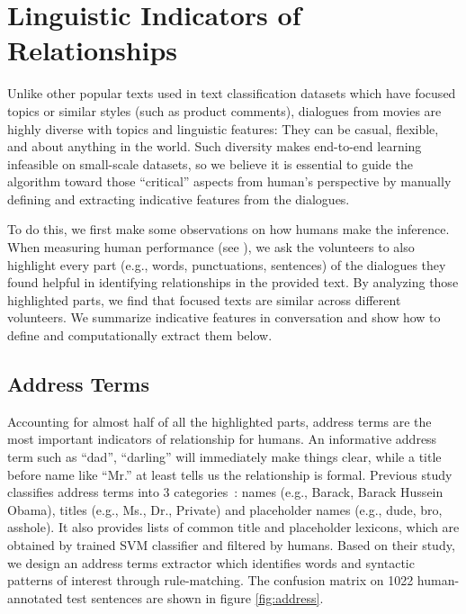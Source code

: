 %
\section{Linguistic Indicators of Relationships}
\label{sec:method}
 
Unlike other popular texts used in text classification datasets which 
have focused topics or similar styles (such as product comments), 
dialogues from movies are highly diverse with topics and linguistic
features: They can be casual, flexible, and about anything in the world.
Such diversity makes end-to-end learning 
infeasible on small-scale datasets, so we believe 
it is essential to guide the algorithm toward those ``critical'' 
aspects from human's perspective by manually defining and extracting 
indicative features from the dialogues.

To do this, we first make some observations on how humans make the inference. 
When measuring human performance (see ), 
we ask the volunteers to also highlight every part 
(e.g., words, punctuations, sentences) of the dialogues they found 
helpful in identifying relationships in the provided text. 
By analyzing those highlighted parts, 
we find that focused texts are similar across different volunteers. 
We summarize indicative features in conversation and show how to define and 
computationally extract them below.  

\subsection*{Address Terms} 
\label{sec:address terms}
Accounting for almost half of all the highlighted parts, address terms are
the most important indicators of relationship for humans. 
An informative address term such as ``dad'', ``darling'' will 
immediately make things clear, while a title before name like 
``Mr.'' at least tells us the relationship is formal. 
Previous study classifies address terms into 
3 categories~\cite{address-term}:
 names (e.g., Barack, Barack Hussein Obama), titles (e.g., Ms., Dr., Private) 
and placeholder names (e.g., dude, bro, asshole). It also provides 
lists of common title and placeholder lexicons, 
which are obtained by trained SVM classifier and filtered by humans. 
Based on their study, we design an address terms extractor which 
identifies words and syntactic patterns of interest through rule-matching. 
The confusion matrix on 1022 human-annotated test sentences are shown 
in figure \ref{fig:address}. 

